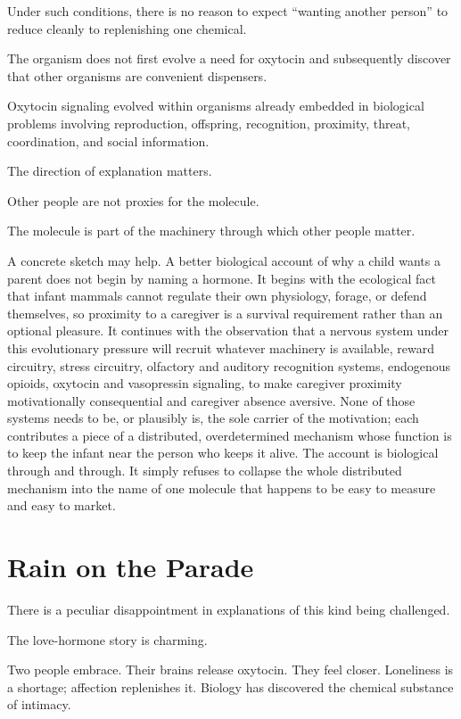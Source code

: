 \documentclass[12pt]{article}
\begin{document}
Under such conditions, there is no reason to expect ``wanting another person'' to reduce cleanly to replenishing one chemical.

The organism does not first evolve a need for oxytocin and subsequently discover that other organisms are convenient dispensers.

Oxytocin signaling evolved within organisms already embedded in biological problems involving reproduction, offspring, recognition, proximity, threat, coordination, and social information.

The direction of explanation matters.

Other people are not proxies for the molecule.

The molecule is part of the machinery through which other people matter.

A concrete sketch may help. A better biological account of why a child wants a parent does not begin by naming a hormone. It begins with the ecological fact that infant mammals cannot regulate their own physiology, forage, or defend themselves, so proximity to a caregiver is a survival requirement rather than an optional pleasure. It continues with the observation that a nervous system under this evolutionary pressure will recruit whatever machinery is available, reward circuitry, stress circuitry, olfactory and auditory recognition systems, endogenous opioids, oxytocin and vasopressin signaling, to make caregiver proximity motivationally consequential and caregiver absence aversive. None of those systems needs to be, or plausibly is, the sole carrier of the motivation; each contributes a piece of a distributed, overdetermined mechanism whose function is to keep the infant near the person who keeps it alive. The account is biological through and through. It simply refuses to collapse the whole distributed mechanism into the name of one molecule that happens to be easy to measure and easy to market.

\section{Rain on the Parade}

There is a peculiar disappointment in explanations of this kind being challenged.

The love-hormone story is charming.

Two people embrace. Their brains release oxytocin. They feel closer. Loneliness is a shortage; affection replenishes it. Biology has discovered the chemical substance of intimacy.
\end{document}
